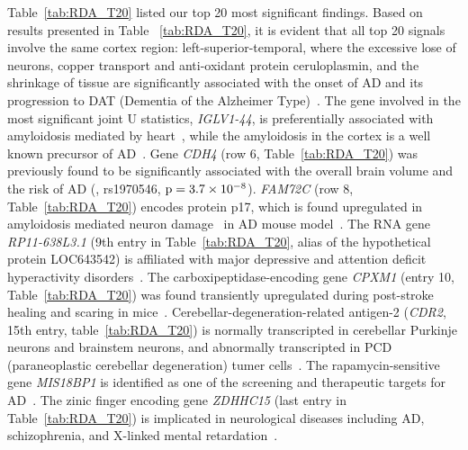 \documentclass[11pt]{article}
\begin{document}
Table~\ref{tab:RDA_T20} listed our top 20 most significant findings. Based on results presented in Table ~\ref{tab:RDA_T20}, it is evident that all top 20 signals involve the same cortex region: left-superior-temporal, where the excessive lose of neurons, copper transport and anti-oxidant protein ceruloplasmin, and the shrinkage of tissue are significantly associated with the onset of AD and its progression to DAT (Dementia of the Alzheimer Type)~\citep{AD:ST1, AD:temporal, AD:ST2}. The gene involved in the most significant joint U statistics, \textit{IGLV1-44}, is preferentially associated with amyloidosis mediated by heart~\citep{GN:IGLV1-44}, while the amyloidosis in the cortex is a well known precursor of AD~\citep{AD:Amyloidosis}. Gene \textit{CDH4} (row 6, Table~\ref{tab:RDA_T20}) was previously found to be significantly associated with the overall brain volume and the risk of AD (\cite{GN:CDH4}, rs1970546, ${\rm p}=3.7 \times 10^{-8}$). \textit{FAM72C} (row 8, Table~\ref{tab:RDA_T20}) encodes protein p17, which is found upregulated in amyloidosis mediated neuron damage~\citep{GN:FAM72C1} in AD mouse model~\citep{GN:FAM72C2}. The RNA gene \textit{RP11-638L3.1} (9th entry in Table~\ref{tab:RDA_T20}, alias of the hypothetical protein LOC643542) is affiliated with major depressive and attention deficit hyperactivity disorders~\citep{GN:RP11-638L3.1}. The carboxipeptidase-encoding gene \textit{CPXM1} (entry 10, Table~\ref{tab:RDA_T20}) was found transiently upregulated during post-stroke healing and scaring in mice~\citep{GN:CPXM1}. Cerebellar-degeneration-related antigen-2 (\textit{CDR2}, 15th entry, table~\ref{tab:RDA_T20}) is normally transcripted in cerebellar Purkinje neurons and brainstem neurons, and abnormally transcripted in PCD (paraneoplastic cerebellar degeneration) tumer cells~\citep{GN:CDR2}. The rapamycin-sensitive gene \textit{MIS18BP1} is identified as one of the screening and therapeutic targets for AD~\citep{GN:MIS18BP1}. The zinic finger encoding gene \textit{ZDHHC15} (last entry in Table~\ref{tab:RDA_T20}) is implicated in neurological diseases including AD, schizophrenia, and X-linked mental retardation~\citep{GN:ZDHHC15_1, GN:ZDHHC15_2}.
\end{document}
